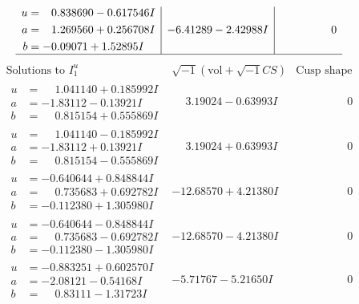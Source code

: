 \documentclass[1p]{elsarticle_modified}
\theoremstyle{definition}
\newcommand{\I}{\sqrt{-1}}
\begin{document}
$$\begin{array}{c|c|c}
\begin{aligned}
u &= \phantom{-}0.838690 - 0.617546 I \\
a &= \phantom{-}1.269560 + 0.256708 I \\
b &= -0.09071 + 1.52895 I\end{aligned}
 & -6.41289 - 2.42988 I & \phantom{-0.000000 } 0\\
 \hline 
 \end{array}$$\newpage$$\begin{array}{c|c|c}  
\text{Solutions to }I^u_{1}& \I (\text{vol} + \sqrt{-1}CS) & \text{Cusp shape}\\
 \hline 
\begin{aligned}
u &= \phantom{-}1.041140 + 0.185992 I \\
a &= -1.83112 - 0.13921 I \\
b &= \phantom{-}0.815154 + 0.555869 I\end{aligned}
 & \phantom{-}3.19024 - 0.63993 I & \phantom{-0.000000 } 0 \\ \hline\begin{aligned}
u &= \phantom{-}1.041140 - 0.185992 I \\
a &= -1.83112 + 0.13921 I \\
b &= \phantom{-}0.815154 - 0.555869 I\end{aligned}
 & \phantom{-}3.19024 + 0.63993 I & \phantom{-0.000000 } 0 \\ \hline\begin{aligned}
u &= -0.640644 + 0.848844 I \\
a &= \phantom{-}0.735683 + 0.692782 I \\
b &= -0.112380 + 1.305980 I\end{aligned}
 & -12.68570 + 4.21380 I & \phantom{-0.000000 } 0 \\ \hline\begin{aligned}
u &= -0.640644 - 0.848844 I \\
a &= \phantom{-}0.735683 - 0.692782 I \\
b &= -0.112380 - 1.305980 I\end{aligned}
 & -12.68570 - 4.21380 I & \phantom{-0.000000 } 0 \\ \hline\begin{aligned}
u &= -0.883251 + 0.602570 I \\
a &= -2.08121 - 0.54168 I \\
b &= \phantom{-}0.83111 - 1.31723 I\end{aligned}
 & -5.71767 - 5.21650 I & \phantom{-0.000000 } 0 \\ \hline\begin{aligned}

\end{aligned}
\end{array}$$
\end{document}
